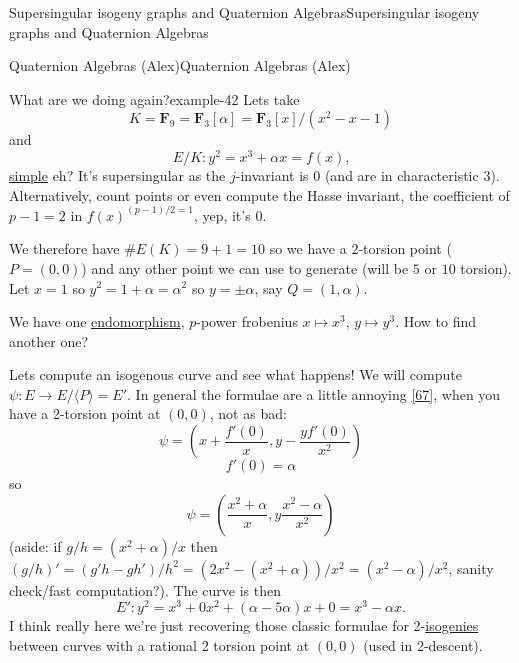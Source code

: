 \documentclass[10pt,]{book}
\numberwithin{equation}{section}
\newcommand{\FF}{\mathbf{F}}
\begin{document}
\begin{chapterptx}{Supersingular isogeny graphs and Quaternion Algebras}{}{Supersingular isogeny graphs and Quaternion Algebras}{}{}
\begin{sectionptx}{Quaternion Algebras (Alex)}{}{Quaternion Algebras (Alex)}{}{}
\begin{introduction}{}
\begin{example}{What are we doing again?}{example-42}%
\hypertarget{p-868}{}%
Lets take%
\begin{equation*}
K = \FF_9 = \FF_3[\alpha] = \FF_3[x]/(x^2- x - 1)
\end{equation*}
and%
\begin{equation*}
E/K\colon y^2 = x^3 + \alpha x = f(x)\text{,}
\end{equation*}
\hyperref[def-simple-av]{simple} eh? It's supersingular as the \(j\)-invariant is 0 (and are in characteristic 3). Alternatively, count points or even compute the Hasse invariant, the coefficient of \(p -1 = 2\) in \(f(x)^{(p-1)/2 = 1}\), yep, it's 0.%
\par
\hypertarget{p-869}{}%
We therefore have \(\#E(K) = 9 + 1 = 10\) so we have a \(2\)-torsion point (\(P = (0,0)\)) and any other point we can use to generate (will be \(5\) or \(10\) torsion). Let \(x = 1\) so \(y^2 = 1 + \alpha = \alpha^2\) so \(y = \pm\alpha\), say \(Q = (1,\alpha)\).%
\par
\hypertarget{p-870}{}%
We have one \hyperref[def-supersing-isog-endo]{endomorphism}, \(p\)-power frobenius \(x\mapsto x^3\), \(y\mapsto y^3\). How to find another one?%
\par
\hypertarget{p-871}{}%
Lets compute an isogenous curve and see what happens! We will compute \(\psi\colon  E \to E/\langle P \rangle = E'\). In general the formulae are  a little annoying \hyperlink{bib-velu}{[67]}, when you have a 2-torsion point at \((0,0)\), not as bad:%
\begin{equation*}
\psi = \left(x + \frac{f'(0)}{x}, y - \frac{yf'(0)}{x^2} \right)
\end{equation*}
%
\begin{equation*}
f'(0) = \alpha
\end{equation*}
so%
\begin{equation*}
\psi= \left(\frac{x^2 + \alpha}{x}, y\frac{x^2 - \alpha}{x^2} \right)
\end{equation*}
(aside: if \(g/h = (x^2+\alpha)/x\) then \((g/h)' = (g' h - g h')/h^2 = (2x^2 - (x^2 + \alpha))/x^2 = (x^2 - \alpha)/x^2\), sanity check/fast computation?). The curve is then%
\begin{equation*}
E'\colon y^2 = x^3 + 0x^2 + (\alpha - 5\alpha)x +0 = x^3  - \alpha x\text{.}
\end{equation*}
I think really here we're just recovering those classic formulae for 2-\hyperref[def-supersing-isog-isog]{isogenies} between curves with a rational 2 torsion point at \((0,0)\) (used in 2-descent).%

\end{example}
\end{introduction}
\end{sectionptx}
\end{chapterptx}
\end{document}

